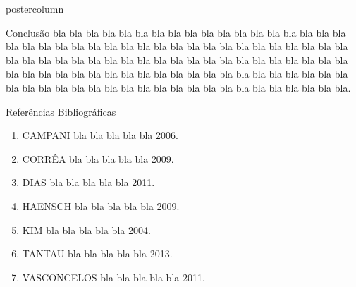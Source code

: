 \documentclass{beamer}
\begin{document}
\begin{frame}
\begin{columns}
\begin{column}{.49 \textwidth}
\begin{beamercolorbox}[center, wd= \textwidth]{postercolumn}
\begin{minipage}[T]{.95 \textwidth}
{\begin{block}{{\Large Conclusão}}
\justifying
{\large
bla bla bla bla bla bla bla bla bla bla bla bla bla bla bla bla bla bla bla bla bla bla bla bla bla bla bla bla bla bla bla bla bla bla bla bla bla bla bla bla bla bla bla bla bla bla bla bla bla bla bla bla bla bla bla bla bla bla bla bla bla bla bla bla bla bla bla bla bla bla bla bla bla bla bla bla bla bla bla bla bla bla bla bla bla bla bla bla bla bla bla bla bla bla bla bla bla bla bla bla bla bla.
}
\end{block}
\vspace{2cm}
\begin{block}{{\Large Referências Bibliográficas}}
{\large \begin{enumerate}
\justifying
\item CAMPANI bla bla bla bla bla 2006. 
\item CORRÊA bla bla bla bla bla 2009.
\item DIAS bla bla bla bla bla 2011.
\item HAENSCH bla bla bla bla bla 2009.
\item KIM bla bla bla bla bla 2004.
\item TANTAU bla bla bla bla bla 2013.
\item VASCONCELOS bla bla bla bla bla 2011.
\end{enumerate}}
\end{block}
}
\end{minipage}
\end{beamercolorbox}
\end{column}
\end{columns}

\end{frame}
\end{document}
